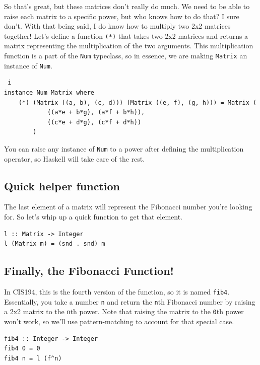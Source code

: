 \documentclass[12pt]{article}
\begin{document}
	So that's great, but these matrices don't really do much. We need to be
	able to raise each matrix to a specific power, but who knows how to do
	that? I sure don't. With that being said, I do know how to multiply two
	2x2 matrices together! Let's define a function \texttt{(*)} that takes
	two 2x2 matrices and returns a matrix representing the multiplication of
	the two arguments. This multiplication function is a part of the
	\texttt{Num} typeclass, so in essence, we are making \texttt{Matrix} an
	instance of \texttt{Num}.

	\begin{lstlisting} i
instance Num Matrix where
	(*) (Matrix ((a, b), (c, d))) (Matrix ((e, f), (g, h))) = Matrix (
			((a*e + b*g), (a*f + b*h)), 
			((c*e + d*g), (c*f + d*h))
		) 
	\end{lstlisting}

	You can raise any instance of \texttt{Num} to a power after defining the
	multiplication operator, so Haskell will take care of the rest.

	\subsection{Quick helper function}\label{quick-helper-function}

	The last element of a matrix will represent the Fibonacci number you're
	looking for. So let's whip up a quick function to get that element.

	\begin{lstlisting} 
l :: Matrix -> Integer 
l (Matrix m) = (snd . snd) m 
	\end{lstlisting}

	\subsection{Finally, the Fibonacci
	Function!}\label{finally-the-fibonacci-function}

	In CIS194, this is the fourth version of the function, so it is named
	\texttt{fib4}. Essentially, you take a number \texttt{n} and return the
	\texttt{n}th Fibonacci number by raising a 2x2 matrix to the
	\texttt{n}th power. Note that raising the matrix to the \texttt{0}th
	power won't work, so we'll use pattern-matching to account for that
	special case.

	\begin{lstlisting} 
fib4 :: Integer -> Integer 
fib4 0 = 0 
fib4 n = l (f^n) 
	\end{lstlisting}
\end{document}
